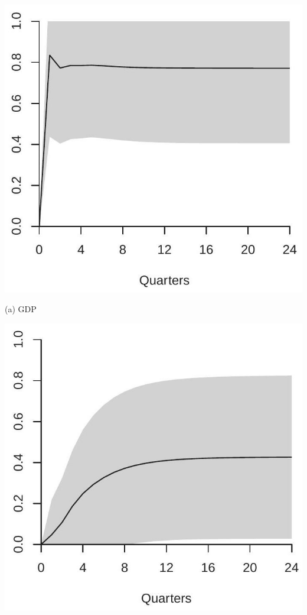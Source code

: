 \documentclass[10pt]{article}
\begin{document}
\includegraphics[max width=\textwidth]{2022_10_23_7c0e31a459390f548ae3g-31}

(a) GDP

\includegraphics[max width=\textwidth]{2022_10_23_7c0e31a459390f548ae3g-31(1)}
\end{document}
